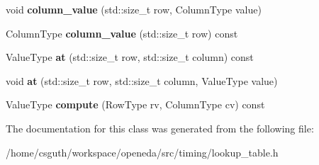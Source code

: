 \begin{DoxyCompactItemize}
\item 
\hypertarget{classophidian_1_1timing_1_1lookup__table_ae97a1c67d4c88760f0b4342040143076}{void {\bfseries column\-\_\-value} (std\-::size\-\_\-t row, Column\-Type value)}\label{classophidian_1_1timing_1_1lookup__table_ae97a1c67d4c88760f0b4342040143076}

\item 
\hypertarget{classophidian_1_1timing_1_1lookup__table_a67573edd96b8bdc0bd7f5aaec6d496b7}{Column\-Type {\bfseries column\-\_\-value} (std\-::size\-\_\-t row) const }\label{classophidian_1_1timing_1_1lookup__table_a67573edd96b8bdc0bd7f5aaec6d496b7}

\item 
\hypertarget{classophidian_1_1timing_1_1lookup__table_a00b9f5e7fd5cc8cb1cfadd495cd6cfa4}{Value\-Type {\bfseries at} (std\-::size\-\_\-t row, std\-::size\-\_\-t column) const }\label{classophidian_1_1timing_1_1lookup__table_a00b9f5e7fd5cc8cb1cfadd495cd6cfa4}

\item 
\hypertarget{classophidian_1_1timing_1_1lookup__table_a32188376b09f4ef9358161721191a4df}{void {\bfseries at} (std\-::size\-\_\-t row, std\-::size\-\_\-t column, Value\-Type value)}\label{classophidian_1_1timing_1_1lookup__table_a32188376b09f4ef9358161721191a4df}

\item 
\hypertarget{classophidian_1_1timing_1_1lookup__table_a954718be972a9b8abae3eeb7e39ee18c}{Value\-Type {\bfseries compute} (Row\-Type rv, Column\-Type cv) const }\label{classophidian_1_1timing_1_1lookup__table_a954718be972a9b8abae3eeb7e39ee18c}

\end{DoxyCompactItemize}


The documentation for this class was generated from the following file\-:\begin{DoxyCompactItemize}
\item 
/home/csguth/workspace/openeda/src/timing/lookup\-\_\-table.\-h\end{DoxyCompactItemize}
